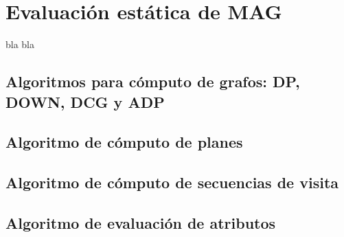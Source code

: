 \chapter{Evaluación estática de MAG }
\label{chap:eval_est}
\minitoc

bla bla

\section{Algoritmos para cómputo de grafos: DP, DOWN, DCG y ADP}





\section{Algoritmo de cómputo de planes}



\section{Algoritmo de cómputo de secuencias de visita}

\section{Algoritmo de evaluación de atributos}


